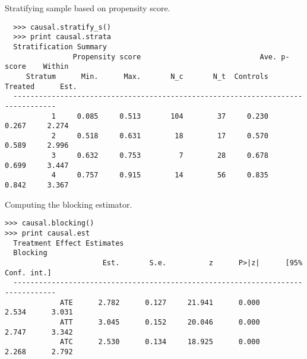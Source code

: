 \documentclass[12pt]{article}
\theoremstyle{definition}
\theoremstyle{definition}
\theoremstyle{definition}
\theoremstyle{remark}
\begin{document}
Stratifying sample based on propensity score.

\begin{verbatim}
  >>> causal.stratify_s()
  >>> print causal.strata
  Stratification Summary
                Propensity score                            Ave. p-score    Within
     Stratum      Min.      Max.       N_c       N_t  Controls   Treated      Est.
  --------------------------------------------------------------------------------
           1     0.085     0.513       104        37     0.230     0.267     2.274
           2     0.518     0.631        18        17     0.570     0.589     2.996
           3     0.632     0.753         7        28     0.678     0.699     3.447
           4     0.757     0.915        14        56     0.835     0.842     3.367
\end{verbatim}

Computing the blocking estimator.

\begin{verbatim}
>>> causal.blocking()
>>> print causal.est
  Treatment Effect Estimates
  Blocking
                       Est.       S.e.          z      P>|z|      [95% Conf. int.]
  --------------------------------------------------------------------------------
             ATE      2.782      0.127     21.941      0.000      2.534      3.031
             ATT      3.045      0.152     20.046      0.000      2.747      3.342
             ATC      2.530      0.134     18.925      0.000      2.268      2.792
\end{verbatim}

\end{document}
